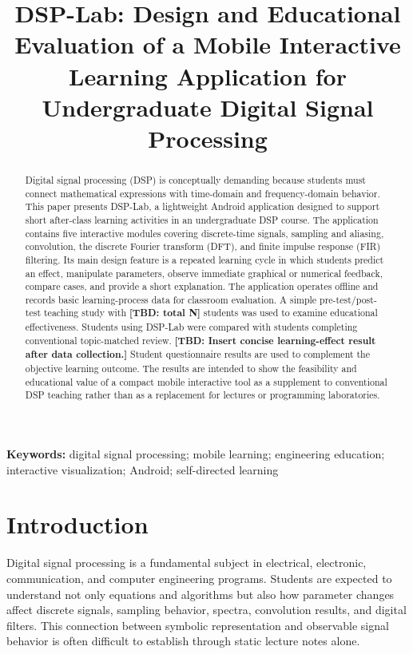 \documentclass[11pt,a4paper]{article}
\title{DSP-Lab: Design and Educational Evaluation of a Mobile Interactive Learning Application for Undergraduate Digital Signal Processing}
\author{}
\date{}
\newcommand{\tbd}[1]{\textbf{[TBD: #1]}}
\begin{document}
\maketitle

\begin{abstract}
Digital signal processing (DSP) is conceptually demanding because students must connect mathematical expressions with time-domain and frequency-domain behavior. This paper presents DSP-Lab, a lightweight Android application designed to support short after-class learning activities in an undergraduate DSP course. The application contains five interactive modules covering discrete-time signals, sampling and aliasing, convolution, the discrete Fourier transform (DFT), and finite impulse response (FIR) filtering. Its main design feature is a repeated learning cycle in which students predict an effect, manipulate parameters, observe immediate graphical or numerical feedback, compare cases, and provide a short explanation. The application operates offline and records basic learning-process data for classroom evaluation. A simple pre-test/post-test teaching study with \tbd{total N} students was used to examine educational effectiveness. Students using DSP-Lab were compared with students completing conventional topic-matched review. \tbd{Insert concise learning-effect result after data collection.} Student questionnaire results are used to complement the objective learning outcome. The results are intended to show the feasibility and educational value of a compact mobile interactive tool as a supplement to conventional DSP teaching rather than as a replacement for lectures or programming laboratories.
\end{abstract}

\noindent\textbf{Keywords:} digital signal processing; mobile learning; engineering education; interactive visualization; Android; self-directed learning

\section{Introduction}
Digital signal processing is a fundamental subject in electrical, electronic, communication, and computer engineering programs. Students are expected to understand not only equations and algorithms but also how parameter changes affect discrete signals, sampling behavior, spectra, convolution results, and digital filters. This connection between symbolic representation and observable signal behavior is often difficult to establish through static lecture notes alone.
\end{document}
